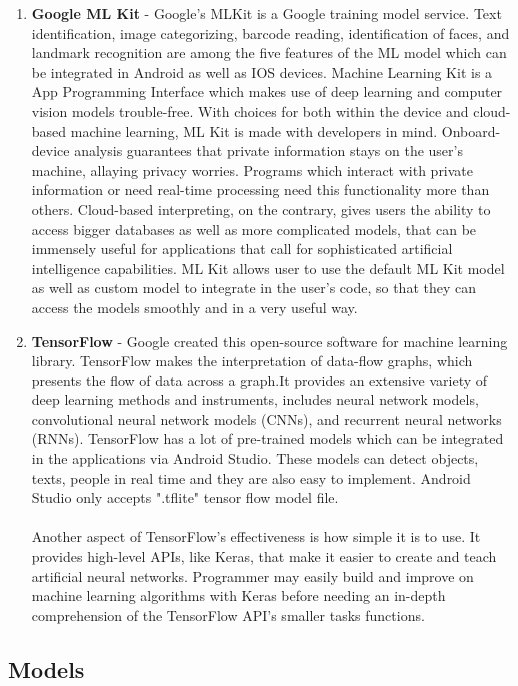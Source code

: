 \documentclass[MScCS]{uccthesis}
\begin{document}
\begin{enumerate}
    \item \textbf{Google ML Kit} - Google's MLKit is a Google training model service. Text identification, image categorizing, barcode reading, identification of faces, and landmark recognition are among the five features of the ML model which can be integrated in Android as well as IOS devices\Parencite{Mlkit1}. Machine Learning Kit is a App Programming Interface which makes use of deep learning and computer vision models trouble-free. With choices for both within the device and cloud-based machine learning, ML Kit is made with developers in mind. Onboard-device analysis guarantees that private information stays on the user's machine, allaying privacy worries. Programs which interact with private information or need real-time processing need this functionality more than others. Cloud-based interpreting, on the contrary, gives users the ability to access bigger databases as well as more complicated models, that can be immensely useful for applications that call for sophisticated artificial intelligence capabilities.
    ML Kit allows user to use the default ML Kit model as well as custom model to integrate in the user's code, so that they can access the models smoothly and in a very useful way. 
    \item \textbf{TensorFlow} - Google created this open-source software for machine learning library. TensorFlow makes the interpretation of data-flow graphs, which presents the flow of data across a graph.It provides an extensive variety of deep learning methods and instruments, includes neural network models, convolutional neural network models (CNNs), and recurrent neural networks (RNNs). TensorFlow has a lot of pre-trained models which can be integrated in the applications via Android Studio. These models can detect objects, texts, people in real time and they are also easy to implement. Android Studio only accepts ".tflite" tensor flow model file.\\
    \\Another aspect of TensorFlow's effectiveness is how simple it is to use. It provides high-level APIs, like Keras, that make it easier to create and teach artificial neural networks. Programmer may easily build and improve on machine learning algorithms with Keras before needing an in-depth comprehension of the TensorFlow API's smaller tasks functions. 


\end{enumerate}
\subsection{Models}
\end{document}
